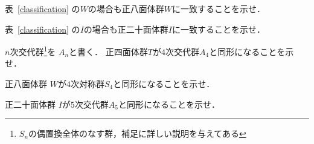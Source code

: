 \begin{Quiz}
   表~\ref{classification}
   の$W$の場合も正八面体群$W$に一致することを示せ．
\end{Quiz}
\begin{Quiz}
   表~\ref{classification}
   の$I$の場合も正二十面体群$I$に一致することを示せ．
\end{Quiz}
\begin{Quiz}
   $n$次交代群\footnote{$S_n$の偶置換全体のなす群，補足に詳しい説明を与えてある}を $A_n$と書く．
   正四面体群$T$が$4$次交代群$A_4$と同形になることを示せ．
\end{Quiz}
\begin{Quiz}
   正八面体群
   $W$が$4$次対称群$S_4$と同形になることを示せ．
\end{Quiz}

\begin{Quiz}
   正二十面体群
   $I$が$5$次交代群$A_5$と同形になることを示せ．
\end{Quiz}


